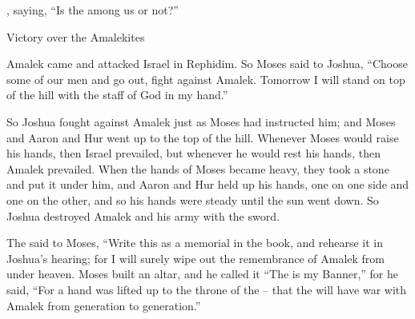 {{},
 saying,
“Is
the {}
among
us or
not?”
\par }{\SH Victory over the Amalekites
\par }{\PP {}Amalek
came
and attacked
Israel
in Rephidim.
So Moses
said to
Joshua,
“Choose
some of our men
and go out,
fight
against Amalek.
Tomorrow
I
will stand
on
top
of the hill
with the staff
of God
in my hand.”
\par }{\PP {}So
Joshua
fought
against Amalek
just as
Moses
had instructed him; and Moses and
Aaron and
Hur went
up to
the top of
the hill.
Whenever
Moses
would raise
his hands,
then Israel
prevailed,
but whenever
he would rest
his hands,
then
Amalek
prevailed.
When the hands
of Moses
became heavy,
they took
a stone
and put
it under
him, and Aaron
and Hur
held up
his hands,
one on one
side and one
on the other, and so
his hands
were steady
until
the sun
went down.
So Joshua
destroyed
Amalek
and his army
with the sword.
\par }{\PP {}The
{}
said
to
Moses,
“Write
this
as a memorial
in the book,
and rehearse it
in Joshua’s
hearing;
for
I will surely
wipe out
the remembrance
of Amalek
from under
heaven.
Moses
built
an altar,
and he called
it “The
{}
is my Banner,”
for he said,
“For
a hand
was lifted up to the throne
of the
{} –
that the
{}
will have war
with Amalek
from generation
to generation.”


}
